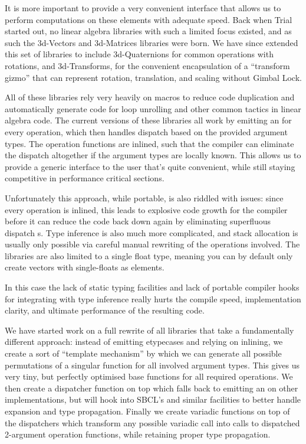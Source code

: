 \documentclass[format=sigconf]{acmart}
\begin{document}
It is more important to provide a very convenient interface that allows us to perform computations on these elements with adequate speed. Back when Trial started out, no linear algebra libraries with such a limited focus existed, and as such the 3d-Vectors and 3d-Matrices libraries were born. We have since extended this set of libraries to include 3d-Quaternions for common operations with rotations, and 3d-Transforms, for the convenient encapsulation of a ``transform gizmo'' that can represent rotation, translation, and scaling without Gimbal Lock.

All of these libraries rely very heavily on macros to reduce code duplication and automatically generate code for loop unrolling and other common tactics in linear algebra code. The current versions of these libraries all work by emitting an  for every operation, which then handles dispatch based on the provided argument types. The operation functions are inlined, such that the compiler can eliminate the dispatch altogether if the argument types are locally known. This allows us to provide a generic interface to the user that's quite convenient, while still staying competitive in performance critical sections.

Unfortunately this approach, while portable, is also riddled with issues: since every operation is inlined, this leads to explosive code growth for the compiler before it can reduce the code back down again by eliminating superfluous dispatch s. Type inference is also much more complicated, and stack allocation is usually only possible via careful manual rewriting of the operations involved. The libraries are also limited to a single float type, meaning you can by default only create vectors with single-floats as elements.

In this case the lack of static typing facilities and lack of portable compiler hooks for integrating with type inference really hurts the compile speed, implementation clarity, and ultimate performance of the resulting code.

We have started work on a full rewrite of all libraries that take a fundamentally different approach: instead of emitting etypecases and relying on inlining, we create a sort of ``template mechanism'' by which we can generate all possible permutations of a singular function for all involved argument types. This gives us very tiny, but perfectly optimised base functions for all required operations. We then create a dispatcher function on top which falls back to emitting an  on other implementations, but will hook into SBCL's  and similar facilities to better handle expansion and type propagation. Finally we create variadic functions on top of the dispatchers which transform any possible variadic call into calls to dispatched 2-argument operation functions, while retaining proper type propagation.
\end{document}
